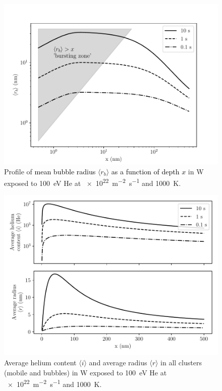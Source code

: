 \begin{figure} [h]
    \centering
    \includegraphics[width=\linewidth]{Figures/Chapter4/half_slab/profile_rb.pdf}
    \caption{Profile of \textcolor{black}{mean bubble radius} $\langle r_b \rangle$ \textcolor{black}{as a function of depth $x$} in W exposed to \SI{100}{eV} He at \SI{e22}{m^{-2}.s^{-1}} and \SI{1000}{K}.}
    \label{fig:profiles rb half slab}
\end{figure}

\begin{figure}
    \centering
    \includegraphics[width=0.75\linewidth]{Figures/Chapter4/half_slab/average_content_radius.pdf}
    \caption{Average helium content $\langle i \rangle$ and average radius $\langle r \rangle$ in all clusters (mobile and bubbles) in W exposed to \SI{100}{eV} He at \SI{e22}{m^{-2}.s^{-1}} and \SI{1000}{K}.}
    \label{fig:content and radius}
\end{figure}

